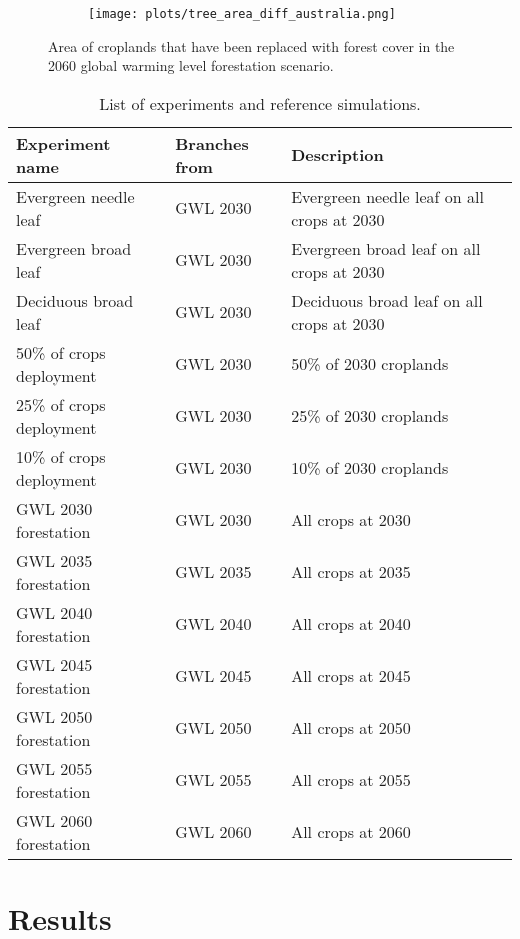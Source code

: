 \documentclass[]{article}
\begin{document}
\begin{figure}[H]
    \begin{subfigure}[b]{\linewidth}
        \centering
        \texttt{[image: plots/tree\_area\_diff\_australia.png]}
    \end{subfigure}
    \caption{Area of croplands that have been replaced with forest cover in the 2060 global warming level forestation scenario.}
    \label{fig:to_forest}
\end{figure}

\begin{table}[]
    \caption{List of experiments and reference simulations.}
    \label{tab:experiments}
    \begin{tabular}{lll}
\hline
Experiment name             & Branches from & Description              \\ \hline
Evergreen needle leaf       & GWL 2030     & Evergreen needle leaf on all crops at 2030          \\
Evergreen broad leaf       & GWL 2030     & Evergreen broad leaf on all crops at 2030           \\
Deciduous broad leaf       & GWL 2030     & Deciduous broad leaf on all crops at 2030           \\
50\% of crops deployment        & GWL 2030     & 50\% of 2030 croplands       \\
25\% of crops deployment       & GWL 2030     & 25\% of 2030 croplands        \\
10\% of crops deployment       & GWL 2030     & 10\% of 2030 croplands        \\
GWL 2030 forestation    & GWL 2030     & All crops at 2030        \\
GWL 2035 forestation   & GWL 2035  & All crops at 2035            \\
GWL 2040 forestation   & GWL 2040  & All crops at 2040            \\
GWL 2045 forestation   & GWL 2045  & All crops at 2045            \\
GWL 2050 forestation   & GWL 2050  & All crops at 2050            \\
GWL 2055 forestation   & GWL 2055  & All crops at 2055            \\
GWL 2060 forestation   & GWL 2060  & All crops at 2060            \\
\end{tabular}
\end{table}

\section{Results}
\end{document}
